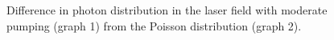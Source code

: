 \begin{figure}
\centering



\caption{Difference in photon distribution in the laser field with moderate pumping (graph 1) from the Poisson distribution  (graph 2).}
\label{figPart2Ch1_5}
\end{figure}